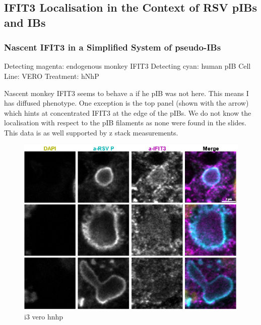 \subsection{IFIT3 Localisation in the Context of RSV pIBs and IBs} \label{subsec:IFIT3 Localisation in the Context of RSV pIBs and IBs}
\subsubsection{Nascent IFIT3 in a Simplified System of pseudo-IBs} \label{Nascent IFIT3 in a Simplified System of pseudo-IBs}
Detecting magenta: endogenous monkey IFIT3 \newline
Detecting cyan: human pIB \newline
Cell Line: VERO \newline
Treatment: hNhP \newline

Nascent monkey IFIT3 seems to behave a if he pIB was not here. This means I has diffused phenotype. One exception is the top panel (shown with the arrow) which hints at concentrated IFIT3 at the edge of the pIBs. We do not know the localisation with respect to the pIB filaments as none were found in the slides. This data is as well supported by z stack measurements.

\begin{figure}
    \centering
    \includegraphics[width=1\linewidth]{09. Chapter 4/Figs/04. IFIT3/01. vero hnhp.png}
    \caption[i3 vero hnhp]{i3 vero hnhp}
    \label{fig:i3 vero hnhp}
\end{figure}

